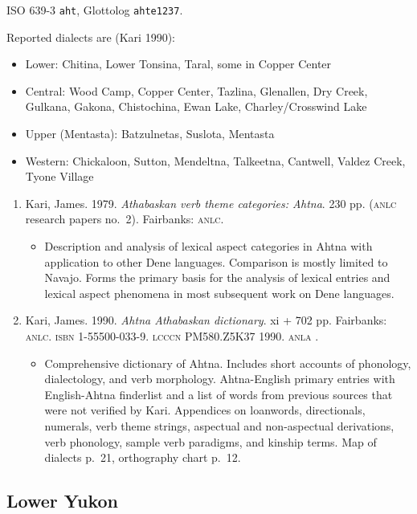 \documentclass[12pt,letterpaper,oneside,article]{memoir}
\begin{document}
ISO 639-3 \texttt{aht}, Glottolog \texttt{ahte1237}.

Reported dialects are (Kari 1990):
\begin{itemize}
\item	Lower: Chitina, Lower Tonsina, Taral, some in Copper Center
\item	Central: Wood Camp, Copper Center, Tazlina, Glenallen, Dry Creek, Gulkana,
	Gakona, Chistochina, Ewan Lake, Charley/Crosswind Lake
\item	Upper (Mentasta): Batzulnetas, Suslota, Mentasta
\item	Western: Chickaloon, Sutton, Mendeltna, Talkeetna, Cantwell, Valdez Creek,
	Tyone Village
\end{itemize}

\begin{enumerate}
\item	Kari, James.
	1979.
	\textit{Athabaskan verb theme categories: Ahtna}.
	230 pp.
	(\textsc{anlc} research papers no.\ 2).
	Fairbanks: \textsc{anlc}.
	\begin{itemize}
	\item	Description and analysis of lexical aspect categories in Ahtna with
		application to other Dene languages.
		Comparison is mostly limited to Navajo.
		Forms the primary basis for the analysis of lexical entries and
		lexical aspect phenomena in most subsequent work on Dene languages.
	\end{itemize}
\item	Kari, James.
	1990.
	\textit{Ahtna Athabaskan dictionary}.
	xi + 702 pp.
	Fairbanks: \textsc{anlc}.
	\textsc{isbn} 1-55500-033-9.
	\textsc{lcccn} PM580.Z5K37 1990.
	\textsc{anla} .
	\begin{itemize}
	\item	Comprehensive dictionary of Ahtna.
		Includes short accounts of phonology, dialectology, and verb morphology.
		Ahtna-English primary entries with English-Ahtna finderlist
		and a list of words from previous sources that were not verified by Kari.
		Appendices on loanwords, directionals, numerals, verb theme strings,
		aspectual and non-aspectual derivations, verb phonology, sample verb
		paradigms, and kinship terms.
		Map of dialects p.\ 21, orthography chart p.\ 12.
	\end{itemize}
\end{enumerate}

\subsection{Lower Yukon}\label{sec:dene-alaska-lower}
\end{document}
